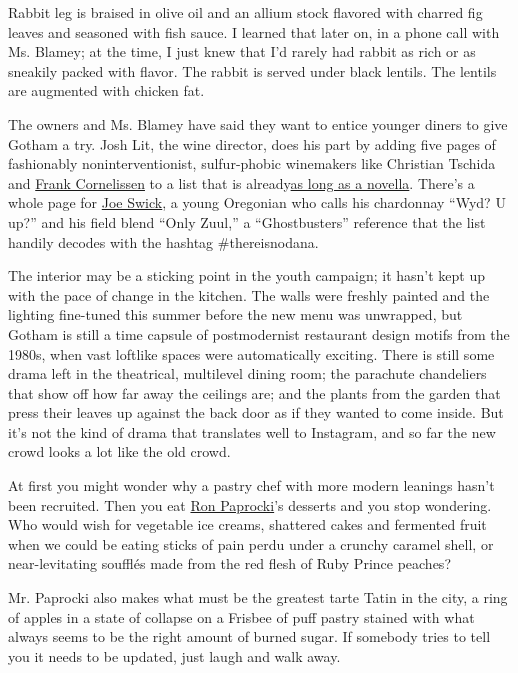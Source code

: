 Rabbit leg is braised in olive oil and an allium stock flavored with
charred fig leaves and seasoned with fish sauce. I learned that later
on, in a phone call with Ms. Blamey; at the time, I just knew that I'd
rarely had rabbit as rich or as sneakily packed with flavor. The rabbit
is served under black lentils. The lentils are augmented with chicken
fat.

The owners and Ms. Blamey have said they want to entice younger diners
to give Gotham a try. Josh Lit, the wine director, does his part by
adding five pages of fashionably noninterventionist, sulfur-phobic
winemakers like Christian Tschida and
\href{https://www.nytimes3xbfgragh.onion/2016/08/31/dining/organic-wine-frank-cornelissen-sicily.html}{Frank
Cornelissen} to a list that is
already\href{https://static1.squarespace.com/static/5ca4ce5ae8ba4423cb55c088/t/5db72721f3cffa778791a022/1572284194223/winelist-186-393+\%281\%29.pdf}{as
long as a novella}. There's a whole page for
\href{https://www.swickwines.com/}{Joe Swick}, a young Oregonian who
calls his chardonnay ``Wyd? U up?'' and his field blend ``Only Zuul,'' a
``Ghostbusters'' reference that the list handily decodes with the
hashtag \#thereisnodana.

The interior may be a sticking point in the youth campaign; it hasn't
kept up with the pace of change in the kitchen. The walls were freshly
painted and the lighting fine-tuned this summer before the new menu was
unwrapped, but Gotham is still a time capsule of postmodernist
restaurant design motifs from the 1980s, when vast loftlike spaces were
automatically exciting. There is still some drama left in the
theatrical, multilevel dining room; the parachute chandeliers that show
off how far away the ceilings are; and the plants from the garden that
press their leaves up against the back door as if they wanted to come
inside. But it's not the kind of drama that translates well to
Instagram, and so far the new crowd looks a lot like the old crowd.

At first you might wonder why a pastry chef with more modern leanings
hasn't been recruited. Then you eat
\href{https://www.starchefs.com/cook/chefs/bio/ron-paprocki}{Ron
Paprocki}'s desserts and you stop wondering. Who would wish for
vegetable ice creams, shattered cakes and fermented fruit when we could
be eating sticks of pain perdu under a crunchy caramel shell, or
near-levitating soufflés made from the red flesh of Ruby Prince peaches?

Mr. Paprocki also makes what must be the greatest tarte Tatin in the
city, a ring of apples in a state of collapse on a Frisbee of puff
pastry stained with what always seems to be the right amount of burned
sugar. If somebody tries to tell you it needs to be updated, just laugh
and walk away.

